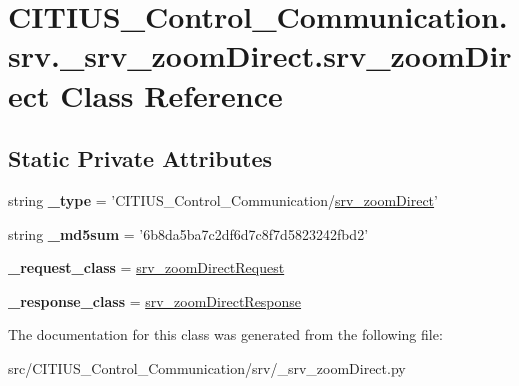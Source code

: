 \hypertarget{class_c_i_t_i_u_s___control___communication_1_1srv_1_1__srv__zoom_direct_1_1srv__zoom_direct}{\section{\-C\-I\-T\-I\-U\-S\-\_\-\-Control\-\_\-\-Communication.\-srv.\-\_\-srv\-\_\-zoom\-Direct.\-srv\-\_\-zoom\-Direct \-Class \-Reference}
\label{class_c_i_t_i_u_s___control___communication_1_1srv_1_1__srv__zoom_direct_1_1srv__zoom_direct}
}
\subsection*{\-Static \-Private \-Attributes}
\begin{DoxyCompactItemize}
\item 
\hypertarget{class_c_i_t_i_u_s___control___communication_1_1srv_1_1__srv__zoom_direct_1_1srv__zoom_direct_a19ed73280ca371c496694d06faa177da}{string {\bfseries \-\_\-type} = '\-C\-I\-T\-I\-U\-S\-\_\-\-Control\-\_\-\-Communication/\hyperlink{class_c_i_t_i_u_s___control___communication_1_1srv_1_1__srv__zoom_direct_1_1srv__zoom_direct}{srv\-\_\-zoom\-Direct}'}\label{class_c_i_t_i_u_s___control___communication_1_1srv_1_1__srv__zoom_direct_1_1srv__zoom_direct_a19ed73280ca371c496694d06faa177da}

\item 
\hypertarget{class_c_i_t_i_u_s___control___communication_1_1srv_1_1__srv__zoom_direct_1_1srv__zoom_direct_a8dc37467bc5cf274ef675c5fdffb11be}{string {\bfseries \-\_\-md5sum} = '6b8da5ba7c2df6d7c8f7d5823242fbd2'}\label{class_c_i_t_i_u_s___control___communication_1_1srv_1_1__srv__zoom_direct_1_1srv__zoom_direct_a8dc37467bc5cf274ef675c5fdffb11be}

\item 
\hypertarget{class_c_i_t_i_u_s___control___communication_1_1srv_1_1__srv__zoom_direct_1_1srv__zoom_direct_a5a67d7f46ea8c5bc0e7226526c6ce5e7}{{\bfseries \-\_\-request\-\_\-class} = \hyperlink{class_c_i_t_i_u_s___control___communication_1_1srv_1_1__srv__zoom_direct_1_1srv__zoom_direct_request}{srv\-\_\-zoom\-Direct\-Request}}\label{class_c_i_t_i_u_s___control___communication_1_1srv_1_1__srv__zoom_direct_1_1srv__zoom_direct_a5a67d7f46ea8c5bc0e7226526c6ce5e7}

\item 
\hypertarget{class_c_i_t_i_u_s___control___communication_1_1srv_1_1__srv__zoom_direct_1_1srv__zoom_direct_a9bebe564ef478312eadf915f651ee4e0}{{\bfseries \-\_\-response\-\_\-class} = \hyperlink{class_c_i_t_i_u_s___control___communication_1_1srv_1_1__srv__zoom_direct_1_1srv__zoom_direct_response}{srv\-\_\-zoom\-Direct\-Response}}\label{class_c_i_t_i_u_s___control___communication_1_1srv_1_1__srv__zoom_direct_1_1srv__zoom_direct_a9bebe564ef478312eadf915f651ee4e0}

\end{DoxyCompactItemize}


\-The documentation for this class was generated from the following file\-:\begin{DoxyCompactItemize}
\item 
src/\-C\-I\-T\-I\-U\-S\-\_\-\-Control\-\_\-\-Communication/srv/\-\_\-srv\-\_\-zoom\-Direct.\-py\end{DoxyCompactItemize}
